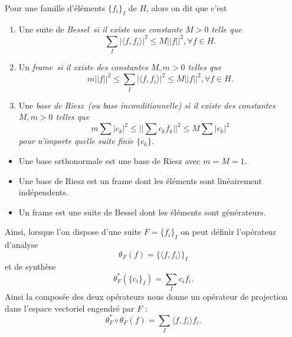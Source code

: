 \begin{definition}
	Pour une famille d'éléments $\{f_i\}_I$ de $H$, alors on dit que c'est 
	\begin{enumerate}
		\item Une suite de \it{Bessel} si il existe une constante $M>0$ telle que
			\begin{equation*}
				\sum_I |\langle f, f_i \rangle|^2 \leq M||f||^2, \forall f \in H.
			\end{equation*}
		\item Un \it{frame} si il existe des constantes $M, m>0$ telles que
			\begin{equation}\label{eq:defFrame}
				m||f||^2 \leq \sum_I |\langle f, f_i\rangle|^2 \leq M||f||^2, \forall f \in H.
			\end{equation}
		\item Une \it{base de Riesz} (ou base \it{inconditionnelle}) si il existe des constantes $M, m>0$ telles que
			\begin{equation*}
				m\sum |c_k|^2 \leq ||\sum c_k f_k||^2 \leq M\sum |c_k|^2
			\end{equation*}
		pour n'importe quelle suite finie $\{c_k\}$.
	\end{enumerate}
\end{definition}
\begin{remarque}
	\begin{itemize}
		\item Une base orthonormale est une base de Riesz avec $m = M = 1$.
		\item Une base de Riesz est un frame dont les éléments sont linéairement indépendents.
		\item Un frame est une suite de Bessel dont les éléments sont générateurs.
	\end{itemize}
\end{remarque}
Ainsi, lorsque l'on dispose d'une suite $F = \{f_i\}_I$ on peut définir l'opérateur d'analyse
\begin{equation*}
	\theta_F (f) = \{\langle f, f_i \rangle\}_I 
\end{equation*}
et de synthèse
\begin{equation*}
	\theta^*_F( \{c_i\}_I) = \sum_I c_i f_i.  
\end{equation*}
Ainsi la composée des deux opérateurs nous donne un opérateur de projection dans l'espace vectoriel engendré par $F$ :
\begin{equation}\label{eq:thetaF}
	\theta^*_F \circ \theta_F (f) = \sum_I \langle f, f_i\rangle f_i. 
\end{equation}
